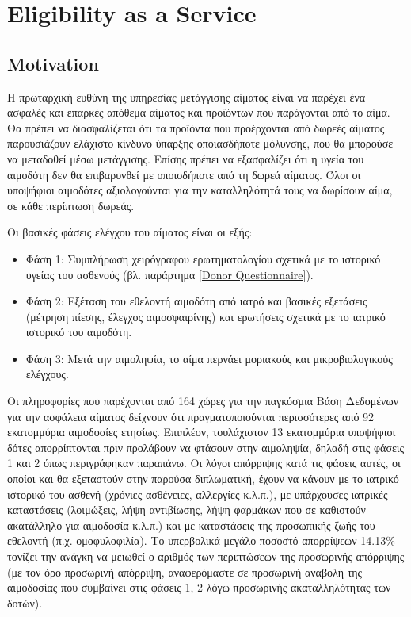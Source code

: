 \section{Eligibility as a Service}

			\subsection{Motivation}
			
						
			Η πρωταρχική ευθύνη της υπηρεσίας μετάγγισης αίματος είναι να παρέχει ένα ασφαλές και επαρκές απόθεμα αίματος και προϊόντων που παράγονται από το αίμα. Θα πρέπει να διασφαλίζεται ότι τα προϊόντα που προέρχονται από δωρεές αίματος παρουσιάζουν ελάχιστο κίνδυνο ύπαρξης οποιασδήποτε μόλυνσης, που θα μπορούσε να μεταδοθεί μέσω μετάγγισης. Επίσης πρέπει να εξασφαλίζει ότι η υγεία του αιμοδότη δεν θα επιβαρυνθεί με οποιοδήποτε από τη δωρεά αίματος. Όλοι οι υποψήφιοι αιμοδότες αξιολογούνται για την καταλληλότητά τους να δωρίσουν αίμα, σε κάθε περίπτωση δωρεάς. 
		
		Οι βασικές φάσεις ελέγχου του αίματος είναι οι εξής:
		\begin{itemize}
		\item Φάση 1: Συμπλήρωση χειρόγραφου ερωτηματολογίου σχετικά με το ιστορικό υγείας του ασθενούς (βλ. παράρτημα \ref{Donor Questionnaire}).
		\item Φάση 2: Εξέταση του εθελοντή αιμοδότη από ιατρό και βασικές εξετάσεις (μέτρηση πίεσης, έλεγχος αιμοσφαιρίνης) και ερωτήσεις σχετικά με το ιατρικό ιστορικό του αιμοδότη.
		\item Φάση 3: Μετά την αιμοληψία, το αίμα περνάει μοριακούς και μικροβιολογικούς ελέγχους.
		\end{itemize}		 
		
		Οι πληροφορίες που παρέχονται από 164 χώρες για την παγκόσμια Βάση Δεδομένων για την ασφάλεια αίματος δείχνουν ότι πραγματοποιούνται περισσότερες από 92 εκατομμύρια αιμοδοσίες ετησίως\cite{WorldHealth}. Επιπλέον, τουλάχιστον 13 εκατομμύρια υποψήφιοι δότες απορρίπτονται πριν προλάβουν να φτάσουν στην αιμοληψία, δηλαδή στις φάσεις 1 και 2 όπως περιγράφηκαν παραπάνω\cite{safety}. Οι λόγοι απόρριψης κατά τις φάσεις αυτές, οι οποίοι και θα εξεταστούν στην παρούσα διπλωματική, έχουν να κάνουν με το ιατρικό ιστορικό του ασθενή (χρόνιες ασθένειες, αλλεργίες κ.λ.π.), με υπάρχουσες ιατρικές καταστάσεις (λοιμώξεις, λήψη αντιβίωσης, λήψη φαρμάκων που σε καθιστούν ακατάλληλο για  αιμοδοσία κ.λ.π.) και με καταστάσεις της προσωπικής ζωής του εθελοντή (π.χ. ομοφυλοφιλία). Το υπερβολικά μεγάλο ποσοστό απορρίψεων 14.13\% τονίζει την ανάγκη να μειωθεί ο αριθμός των περιπτώσεων της προσωρινής απόρριψης (με τον όρο προσωρινή απόρριψη, αναφερόμαστε σε προσωρινή αναβολή της αιμοδοσίας που συμβαίνει στις φάσεις 1, 2 λόγω προσωρινής ακαταλληλότητας των δοτών).

